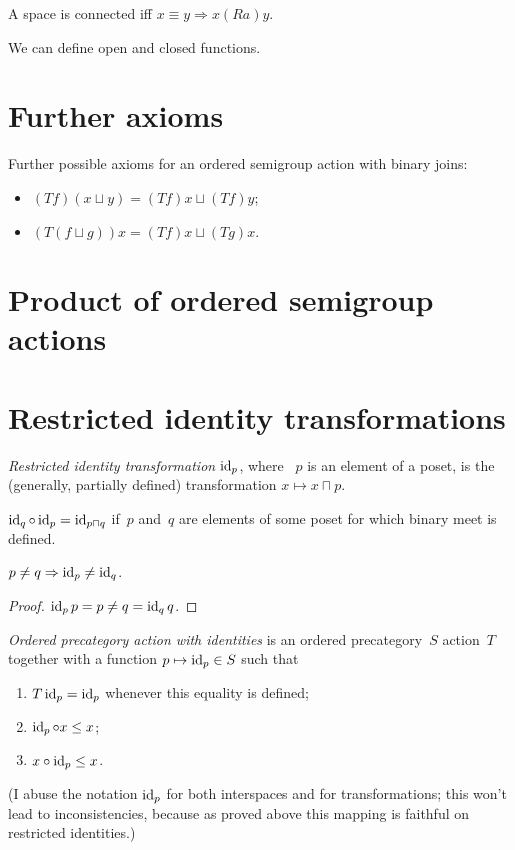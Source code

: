 A space is connected iff $x\equiv y\Rightarrow x(Ra)y$.

We can define open and closed functions.

\chapter{Further axioms}

Further possible axioms for an ordered semigroup action with binary joins:

\begin{itemize}
\item $(Tf)(x\sqcup y)=(Tf)x\sqcup(Tf)y$;
\item $(T(f\sqcup g))x=(Tf)x\sqcup(Tg)x$.
\end{itemize}


\chapter{Product of ordered semigroup actions}


\chapter{Restricted identity transformations}

\emph{Restricted identity transformation} $\operatorname{id}_p$, where ~$p$ is an element of a poset, is the (generally, partially defined) transformation $x\mapsto x\sqcap p$.

\begin{obvious}
$\operatorname{id}_q\circ\operatorname{id}_p = \operatorname{id}_{p\sqcap q}$ if~$p$ and~$q$ are elements of some poset for which binary meet is defined.
\end{obvious}

\begin{prop}
$p\ne q\Rightarrow\operatorname{id}_p\ne\operatorname{id}_q$.
\end{prop}

\begin{proof}
$\operatorname{id}_p p=p \ne q = \operatorname{id}_q q$.
\end{proof}

\emph{Ordered precategory action with identities} is an ordered precategory~$S$ action~$T$ together with a function $p\mapsto\operatorname{id}_p\in S$ such that
\begin{enumerate}
\item $T\operatorname{id}_p=\operatorname{id}_p$ whenever this equality is defined;
\item $\operatorname{id}_p\circ x\leq x$;
\item $x\circ\operatorname{id}_p\leq x$.
\end{enumerate}
(I abuse the notation $\operatorname{id}_p$ for both interspaces and for transformations; this won't lead to inconsistencies, because as proved above this mapping is faithful on restricted identities.)

